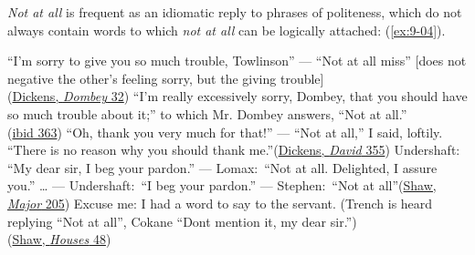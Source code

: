\textit{Not at all} is frequent as an idiomatic reply to phrases of politeness, which do not always contain words to which \textit{not at all} can be logically attached: (\ref{ex:9-04}).

\ea \label{ex:9-04}
\ea ``I'm sorry to give you so much trouble, Towlinson'' --- ``Not at all miss'' [does not negative the other's feeling sorry, but the giving trouble]\\\hfill(\href{https://archive.org/details/dombeyson00dick_0/page/58/mode/2up? q=%22I%27m+sorry+to+give%22&view=theater}{Dickens, \textit{Dombey} 32}) %
\ex ``I'm really excessively sorry, Dombey, that you should have so much trouble about it;'' to which Mr. Dombey answers, ``Not at all.''\\\hfill(\href{https://archive.org/details/dombeyson00dick_0/page/568/mode/2up?q=%22not+at+all%22&view=theater}{ibid 363}) %
\ex ``Oh, thank you very much for that!'' --- ``Not at all,'' I said, loftily. ``There is no reason why you should thank me.''\hfill(\href{https://archive.org/details/personalhistory05dickgoog/page/n157/mode/2up?q=%22loftily%22&view=theater}{Dickens, \textit{David} 355}) %
\ex
Undershaft: ``My dear sir, I beg your pardon.'' --- Lomax:~``Not at all. Delighted, I assure you.'' {\dots} --- Undershaft:~``I beg your pardon.'' --- Stephen:~``Not at all''\hfill(\href{https://archive.org/details/johnbullsotheris00shawrich/page/204/mode/2up?q=%22my+dear+stephen%22&view=theater}{Shaw, \textit{Major} 205}) %
\ex Excuse me: I had a word to say to the servant. (Trench is heard replying ``Not at all'', Cokane ``Dont mention it, my dear sir.'')\\\hfill(\href{https://archive.org/details/widowershousesun00shaw/page/50/mode/2up?q=%22not+at+all%22}{Shaw, \textit{Houses} 48}) %
\z
\z

